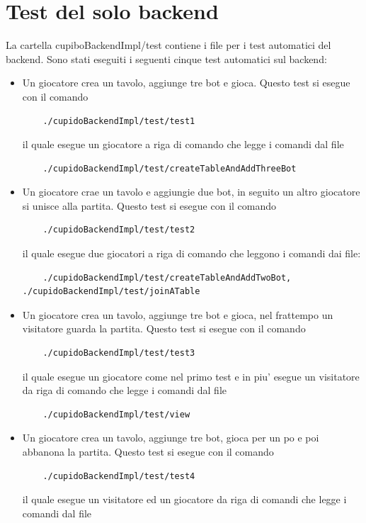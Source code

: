 \section{Test del solo backend}
  La cartella cupiboBackendImpl/test contiene i file per i test automatici del backend. Sono stati eseguiti i seguenti cinque test automatici sul backend:
  \begin{itemize}
    \item 
      Un giocatore crea un tavolo, aggiunge tre bot e gioca. Questo test si esegue con il comando
      \begin{verbatim}
	./cupidoBackendImpl/test/test1
      \end{verbatim}
      il quale esegue un giocatore a riga di comando che legge i comandi dal file 
      \begin{verbatim}
	./cupidoBackendImpl/test/createTableAndAddThreeBot
      \end{verbatim}
    \item
      Un giocatore crae un tavolo e aggiungie due bot, in seguito un altro giocatore si unisce alla partita. Questo test si esegue con il comando
      \begin{verbatim}
	./cupidoBackendImpl/test/test2
      \end{verbatim}
      il quale esegue due giocatori a riga di comando che leggono i comandi dai file:
      \begin{verbatim}
	./cupidoBackendImpl/test/createTableAndAddTwoBot, ./cupidoBackendImpl/test/joinATable
      \end{verbatim}
    \item
      Un giocatore crea un tavolo, aggiunge tre bot e gioca, nel frattempo un visitatore guarda la partita. Questo test si esegue con il comando
      \begin{verbatim}
	./cupidoBackendImpl/test/test3
      \end{verbatim}
      il quale esegue un giocatore come nel primo test e in piu' esegue un visitatore da riga di comando che legge i comandi dal file
      \begin{verbatim}
	./cupidoBackendImpl/test/view
      \end{verbatim}
    \item
      Un giocatore crea un tavolo, aggiunge tre bot, gioca per un po e poi abbanona la partita. Questo test si esegue con il comando
      \begin{verbatim}
	./cupidoBackendImpl/test/test4
      \end{verbatim}
      il quale esegue un visitatore ed un giocatore da riga di comandi che legge i comandi dal file 

\end{itemize}
